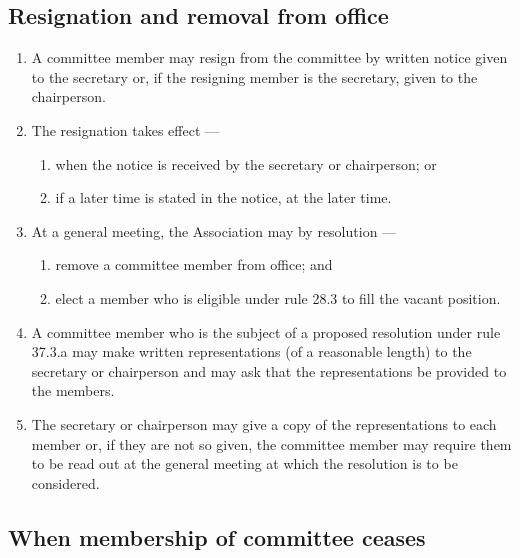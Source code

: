 \documentclass[../constitution.tex]{subfiles}
\begin{document}
\hypertarget{resignation-and-removal-from-office}{%
\subsection{Resignation and removal from office}\label{resignation-and-removal-from-office}}

\begin{enumerate}

\item A committee member may resign from the committee by written notice given to the secretary or, if the resigning member is the secretary, given to the chairperson.
\item The resignation takes effect ---

  \begin{enumerate}
  
  \item when the notice is received by the secretary or chairperson; or
  \item if a later time is stated in the notice, at the later time.
  \end{enumerate}
\item At a general meeting, the Association may by resolution ---

  \begin{enumerate}
  
  \item remove a committee member from office; and
  \item elect a member who is eligible under rule 28.3 to fill the vacant position.
  \end{enumerate}
\item A committee member who is the subject of a proposed resolution under rule 37.3.a may make written representations (of a reasonable length) to the secretary or chairperson and may ask that the representations be provided to the members.
\item The secretary or chairperson may give a copy of the representations to each member or, if they are not so given, the committee member may require them to be read out at the general meeting at which the resolution is to be considered.
\end{enumerate}

\hypertarget{when-membership-of-committee-ceases}{%
\subsection{When membership of committee ceases}\label{when-membership-of-committee-ceases}}
\end{document}
